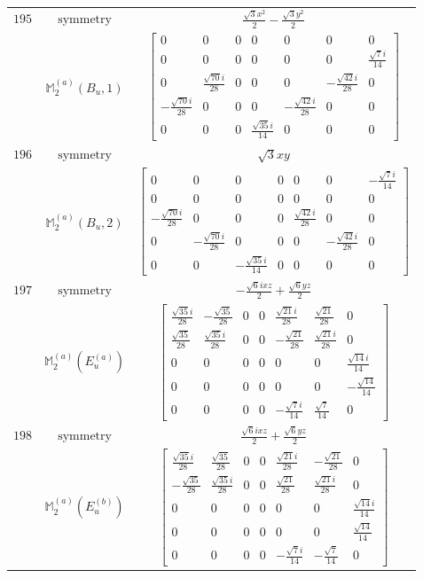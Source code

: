 \documentclass[fleqn,8pt,landscape]{jsarticle}
\begin{document}
\begin{longtable}{ccc}
$ 195 $ & $ \text{symmetry} $ & $ \frac{\sqrt{3} x^{2}}{2} - \frac{\sqrt{3} y^{2}}{2} $ \\
$  $ & $ \mathbb{M}_{2}^{(a)}(B_{u},1) $ & $ \begin{bmatrix} 0 & 0 & 0 & 0 & 0 & 0 & 0 \\ 0 & 0 & 0 & 0 & 0 & 0 & \frac{\sqrt{7} i}{14} \\ 0 & \frac{\sqrt{70} i}{28} & 0 & 0 & 0 & - \frac{\sqrt{42} i}{28} & 0 \\ - \frac{\sqrt{70} i}{28} & 0 & 0 & 0 & - \frac{\sqrt{42} i}{28} & 0 & 0 \\ 0 & 0 & 0 & \frac{\sqrt{35} i}{14} & 0 & 0 & 0 \end{bmatrix} $ \\ \hline
$ 196 $ & $ \text{symmetry} $ & $ \sqrt{3} x y $ \\
$  $ & $ \mathbb{M}_{2}^{(a)}(B_{u},2) $ & $ \begin{bmatrix} 0 & 0 & 0 & 0 & 0 & 0 & - \frac{\sqrt{7} i}{14} \\ 0 & 0 & 0 & 0 & 0 & 0 & 0 \\ - \frac{\sqrt{70} i}{28} & 0 & 0 & 0 & \frac{\sqrt{42} i}{28} & 0 & 0 \\ 0 & - \frac{\sqrt{70} i}{28} & 0 & 0 & 0 & - \frac{\sqrt{42} i}{28} & 0 \\ 0 & 0 & - \frac{\sqrt{35} i}{14} & 0 & 0 & 0 & 0 \end{bmatrix} $ \\ \hline
$ 197 $ & $ \text{symmetry} $ & $ - \frac{\sqrt{6} i x z}{2} + \frac{\sqrt{6} y z}{2} $ \\
$  $ & $ \mathbb{M}_{2}^{(a)}(E_{u}^{(a)}) $ & $ \begin{bmatrix} \frac{\sqrt{35} i}{28} & - \frac{\sqrt{35}}{28} & 0 & 0 & \frac{\sqrt{21} i}{28} & \frac{\sqrt{21}}{28} & 0 \\ \frac{\sqrt{35}}{28} & \frac{\sqrt{35} i}{28} & 0 & 0 & - \frac{\sqrt{21}}{28} & \frac{\sqrt{21} i}{28} & 0 \\ 0 & 0 & 0 & 0 & 0 & 0 & \frac{\sqrt{14} i}{14} \\ 0 & 0 & 0 & 0 & 0 & 0 & - \frac{\sqrt{14}}{14} \\ 0 & 0 & 0 & 0 & - \frac{\sqrt{7} i}{14} & \frac{\sqrt{7}}{14} & 0 \end{bmatrix} $ \\ \hline
$ 198 $ & $ \text{symmetry} $ & $ \frac{\sqrt{6} i x z}{2} + \frac{\sqrt{6} y z}{2} $ \\
$  $ & $ \mathbb{M}_{2}^{(a)}(E_{u}^{(b)}) $ & $ \begin{bmatrix} \frac{\sqrt{35} i}{28} & \frac{\sqrt{35}}{28} & 0 & 0 & \frac{\sqrt{21} i}{28} & - \frac{\sqrt{21}}{28} & 0 \\ - \frac{\sqrt{35}}{28} & \frac{\sqrt{35} i}{28} & 0 & 0 & \frac{\sqrt{21}}{28} & \frac{\sqrt{21} i}{28} & 0 \\ 0 & 0 & 0 & 0 & 0 & 0 & \frac{\sqrt{14} i}{14} \\ 0 & 0 & 0 & 0 & 0 & 0 & \frac{\sqrt{14}}{14} \\ 0 & 0 & 0 & 0 & - \frac{\sqrt{7} i}{14} & - \frac{\sqrt{7}}{14} & 0 \end{bmatrix} $ \\ \hline

\end{longtable}
\end{document}
